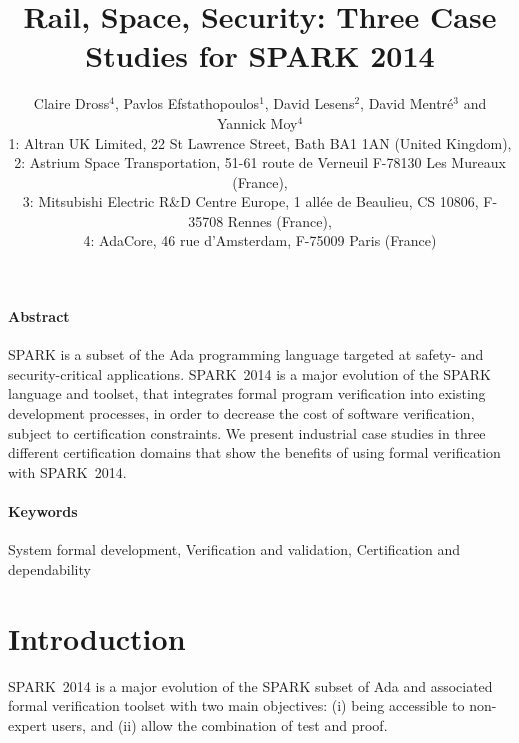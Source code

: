 \documentclass[10pt,a4paper,twocolumn]{article}
\newcommand{\newspark}{SPARK~2014\xspace}
\begin{document}
\title{Rail, Space, Security: Three Case Studies for SPARK 2014}

\author{%
\large Claire Dross$^4$, Pavlos Efstathopoulos$^1$, David Lesens$^2$, David Mentré$^3$ and Yannick Moy$^4$\\
\normalsize 1: Altran UK Limited, 22 St Lawrence Street, Bath BA1 1AN (United Kingdom),\\
\normalsize 2: Astrium Space Transportation, 51-61 route de Verneuil F-78130 Les Mureaux (France),\\
\normalsize 3: Mitsubishi Electric R\&D Centre Europe, 1 allée de
Beaulieu, CS 10806, F-35708 Rennes (France),\\
\normalsize 4: AdaCore, 46 rue d'Amsterdam, F-75009 Paris (France)}

\date{}

\maketitle

\paragraph{Abstract}
SPARK is a subset of the Ada programming language targeted at safety-
and security-critical applications. \newspark is a major evolution of
the SPARK language and toolset, that integrates formal program
verification into existing development processes, in order to decrease
the cost of software verification, subject to certification
constraints. We present industrial case studies in three different
certification domains that show the benefits of using formal
verification with \newspark.

\paragraph{Keywords}
System formal development, Verification and validation,
Certification and dependability

\section{Introduction}

\newspark is a major evolution of the SPARK subset of Ada and associated formal
verification toolset with two main objectives: (i) being accessible to
non-expert users, and (ii) allow the combination of test and proof.
\end{document}

